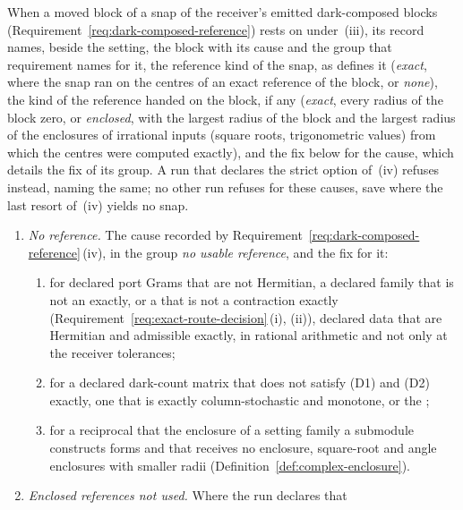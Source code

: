 \begin{requirement}\label{req:snap-fix}
When a moved block of a snap of the receiver's emitted dark-composed blocks
(Requirement~\ref{req:dark-composed-reference}) rests on
 under
\,(iii), its record names, beside the
setting, the block with its cause and the group that requirement names for
it, the reference kind of the snap, as 
defines it (\emph{exact}, where the snap ran on the centres of an exact
reference of the block, or \emph{none}), the kind of the reference handed on
the block, if any (\emph{exact}, every radius of the block zero, or
\emph{enclosed}, with the largest radius of the block and the largest radius
of the enclosures of irrational inputs (square roots, trigonometric values)
from which the centres were computed exactly), and the fix below for the
cause, which details the fix of its group. A run that declares the strict
option of \,(iv) refuses instead,
naming the same; no other run refuses for these causes, save where the last
resort of \,(iv) yields no snap.
\begin{enumerate}[label=(\roman*),leftmargin=2.4em]
\item \emph{No reference.} The cause recorded by
  Requirement~\ref{req:dark-composed-reference}\,(iv), in the group
  \emph{no usable reference}, and the fix for it:
  \begin{enumerate}[label=(\alph*),leftmargin=2.0em]
  \item for declared port Grams that are not Hermitian, a declared family that
    is not an  exactly, or a  that is not a
    contraction exactly (Requirement~\ref{req:exact-route-decision}\,(i),
    (ii)), declared data that are Hermitian and admissible exactly, in
    rational arithmetic and not only at the receiver tolerances;
  \item for a declared dark-count matrix that does not satisfy (D1) and (D2)
    exactly, one that is exactly column-stochastic and monotone, or the
    ;
  \item for a reciprocal that the enclosure of a setting family a submodule
    constructs forms and that receives no enclosure, square-root and angle
    enclosures with smaller
    radii (Definition~\ref{def:complex-enclosure}).
  \end{enumerate}
\item \emph{Enclosed references not used.} Where the run declares that

\end{enumerate}
\end{requirement}
